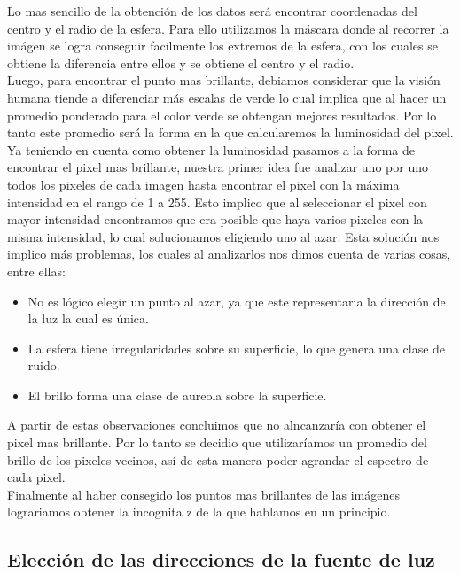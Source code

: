 Lo mas sencillo de la obtención de los datos será encontrar coordenadas del centro y el radio de la esfera. Para ello utilizamos la máscara donde al recorrer la imágen se logra conseguir facilmente los extremos de la esfera, con los cuales se obtiene la diferencia entre ellos y se obtiene el centro y el radio. \\

Luego, para encontrar el punto mas brillante, debiamos considerar que la visión humana tiende a diferenciar más escalas de verde lo cual implica que al hacer un promedio ponderado para el color verde se obtengan mejores resultados. Por lo tanto este promedio será la forma en la que calcularemos la luminosidad del pixel.\\

Ya teniendo en cuenta como obtener la luminosidad pasamos a la forma de encontrar el pixel mas brillante, nuestra primer idea fue analizar uno por uno todos los pixeles de cada imagen hasta encontrar el pixel con la máxima intensidad en el rango de 1 a 255.
Esto implico que al seleccionar el pixel con mayor intensidad encontramos que era posible que haya varios pixeles con la misma intensidad, lo cual solucionamos eligiendo uno al azar.
Esta solución nos implico más problemas, los cuales al analizarlos nos dimos cuenta de varias cosas, entre ellas:
\begin{itemize}
	\item  No es lógico elegir un punto al azar, ya que este representaria la dirección de la luz la cual es única.
	\item La esfera tiene irregularidades sobre su superficie, lo que genera una clase de ruido.
	\item El brillo forma una clase de aureola sobre la superficie.
\end{itemize}
A partir de estas observaciones concluimos que no alncanzaría con obtener el pixel mas brillante. Por lo tanto se decidio que utilizaríamos un promedio del brillo de los pixeles vecinos, así de esta manera poder agrandar el espectro de cada pixel.\\

Finalmente al haber consegido los puntos mas brillantes de las imágenes lograriamos obtener la incognita z de la que hablamos en un principio.


\subsection{Elección de las direcciones de la fuente de luz}

